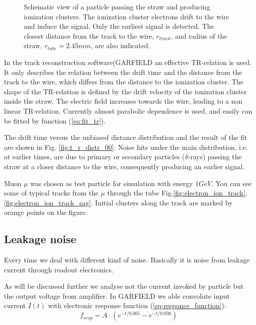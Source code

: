 \documentclass[]{article}
\begin{document}
\begin{figure}[h]
	\caption{Schematic view of a particle passing the straw and producing
ionization clusters. The ionization cluster electrons drift to the wire and
induce the signal. Only the earliest signal is detected. The closest distance
from the track to the wire, $r_{track}$, and radius of the straw, $r_{tube} = 2.45 mm$, are also indicated.}
	\label{fig:track_reconstruction}
	\end{figure}


	In the track reconstruction software(GARFIELD \cite{garfield} an effective TR-relation is used. It only describes the relation between the drift time and the distance from the track to the wire, which differs from the distance to the ionization cluster. The shape of the TR-relation is defined by the drift velocity of the ionization cluster inside the straw. The electric field increases towards the wire, leading to a non linear TR-relation. Currently almost parabolic dependence is used, and easily can be fitted by function (\ref{eq:fit_tr}).

	The drift time versus the unbiased distance distribution and the result of the fit are shown in Fig. \ref{fig:t_r_distr_00}. Noise hits under the main distribution, i.e. at earlier times, are due to primary or secondary particles ($\delta$-rays) passing the straw at a closer distance to the wire, consequently producing an earlier signal.
	
	Muon $\mu$ was chosen as test particle for simulation with energy $1GeV$. You can see some of typical tracks from the $\mu$ through the tube Fig.\ref{fig:electron_ion_track},\ref{fig:electron_ion_track_sag}. Initial clusters along the track are marked by orange points on the figure.
			
	
	\subsection{ Leakage noise}
	Every time we deal with different kind of noise. Basically it is noise from  leakage current through readout electronics.

	As will be discussed further we analyse not the current invoked by particle but the output voltage from amplifier. In GARFIELD we able convolute input current $I(t)$ with electronic response function (\ref{eq:responce_function}): 
	\begin{equation}
	f_{resp} =  A\cdot(e^{-t/0.005} - e^{-t/0.030})
	\label{eq:responce_function}
	\end{equation}
	
\end{document}
